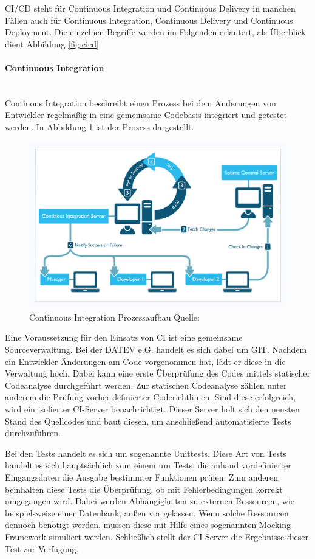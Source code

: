 CI/CD steht für \glqq Continuous Integration und Continuous Delivery\grqq{} in manchen Fällen auch für \glqq Continuous Integration, Continuous Delivery und Continuous Deployment\grqq{}.
Die einzelnen Begriffe werden im Folgenden erläutert, als Überblick dient Abbildung \ref{fig:cicd}
\paragraph{\glqq Continuous Integration\grqq}~\\
Continous Integration beschreibt einen Prozess bei dem Änderungen von Entwickler regelmäßig in eine gemeinsame Codebasis integriert und getestet werden.
In Abbildung \ref{fig:ci} ist der Prozess dargestellt.
\begin{figure}[h]
	\centering
	\includegraphics[width=\textwidth]{figures/CI.png}
	\caption{Continuous Integration Prozessaufbau Quelle: \cite{cibild.25.2.2020}}
	\label{fig:ci}
\end{figure}
Eine Voraussetzung für den Einsatz von CI ist eine gemeinsame Sourceverwaltung.
Bei der DATEV e.G. handelt es sich dabei um GIT.
Nachdem ein Entwickler Änderungen am Code vorgenommen hat, lädt er diese in die Verwaltung hoch.
Dabei kann eine erste Überprüfung des Codes mittels statischer Codeanalyse durchgeführt werden.
Zur statischen Codeanalyse zählen unter anderem die Prüfung vorher definierter Coderichtlinien.
Sind diese erfolgreich, wird ein isolierter CI-Server benachrichtigt.
Dieser Server holt sich den neusten Stand des Quellcodes und baut diesen, um anschließend automatisierte Tests durchzuführen.

Bei den Tests handelt es sich um sogenannte \glqq Unittests\grqq.
Diese Art von Tests handelt es sich hauptsächlich zum einem um Tests, die anhand vordefinierter Eingangsdaten die Ausgabe bestimmter Funktionen prüfen.
Zum anderen beinhalten diese Tests die Überprüfung, ob mit Fehlerbedingungen korrekt umgegangen wird.
Dabei werden Abhängigkeiten zu externen Ressourcen, wie beispielsweise einer Datenbank, außen vor gelassen.
Wenn solche Ressourcen dennoch benötigt werden, müssen diese mit Hilfe eines sogenannten \glqq Mocking-Framework\grqq{} simuliert werden.
Schließlich stellt der CI-Server die Ergebnisse dieser Test zur Verfügung.

